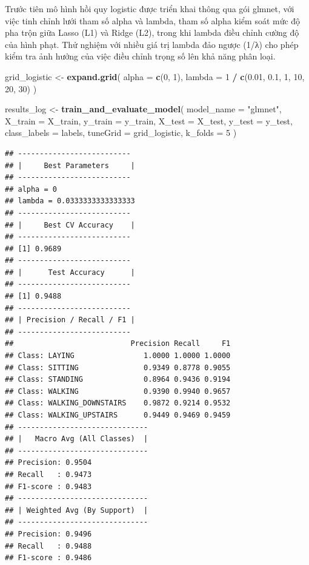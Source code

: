 \documentclass[
]{article}
\newenvironment{Shaded}{\begin{snugshade}}{\end{snugshade}}
\newcommand{\AttributeTok}[1]{\textcolor[rgb]{0.13,0.29,0.53}{#1}}
\newcommand{\DecValTok}[1]{\textcolor[rgb]{0.00,0.00,0.81}{#1}}
\newcommand{\FloatTok}[1]{\textcolor[rgb]{0.00,0.00,0.81}{#1}}
\newcommand{\FunctionTok}[1]{\textcolor[rgb]{0.13,0.29,0.53}{\textbf{#1}}}
\newcommand{\NormalTok}[1]{#1}
\newcommand{\OtherTok}[1]{\textcolor[rgb]{0.56,0.35,0.01}{#1}}
\newcommand{\SpecialCharTok}[1]{\textcolor[rgb]{0.81,0.36,0.00}{\textbf{#1}}}
\newcommand{\StringTok}[1]{\textcolor[rgb]{0.31,0.60,0.02}{#1}}
\begin{document}
Trước tiên mô hình hồi quy logistic được triển khai thông qua gói
glmnet, với việc tinh chỉnh lưới tham số alpha và lambda, tham số alpha
kiểm soát mức độ pha trộn giữa Lasso (L1) và Ridge (L2), trong khi
lambda điều chỉnh cường độ của hình phạt. Thử nghiệm với nhiều giá trị
lambda đảo ngược (1/λ) cho phép kiểm tra ảnh hưởng của việc điều chỉnh
trọng số lên khả năng phân loại.

\begin{Shaded}
\begin{Highlighting}[]
\NormalTok{grid\_logistic }\OtherTok{\textless{}{-}} \FunctionTok{expand.grid}\NormalTok{(}
  \AttributeTok{alpha =} \FunctionTok{c}\NormalTok{(}\DecValTok{0}\NormalTok{, }\DecValTok{1}\NormalTok{),}
  \AttributeTok{lambda =} \DecValTok{1} \SpecialCharTok{/} \FunctionTok{c}\NormalTok{(}\FloatTok{0.01}\NormalTok{, }\FloatTok{0.1}\NormalTok{, }\DecValTok{1}\NormalTok{, }\DecValTok{10}\NormalTok{, }\DecValTok{20}\NormalTok{, }\DecValTok{30}\NormalTok{)}
\NormalTok{)}

\NormalTok{results\_log }\OtherTok{\textless{}{-}} \FunctionTok{train\_and\_evaluate\_model}\NormalTok{(}
  \AttributeTok{model\_name =} \StringTok{"glmnet"}\NormalTok{,}
  \AttributeTok{X\_train =}\NormalTok{ X\_train,}
  \AttributeTok{y\_train =}\NormalTok{ y\_train,}
  \AttributeTok{X\_test =}\NormalTok{ X\_test, }
  \AttributeTok{y\_test =}\NormalTok{ y\_test,}
  \AttributeTok{class\_labels =}\NormalTok{ labels,}
  \AttributeTok{tuneGrid =}\NormalTok{ grid\_logistic,}
  \AttributeTok{k\_folds =} \DecValTok{5}
\NormalTok{)}
\end{Highlighting}
\end{Shaded}

\begin{verbatim}
## --------------------------
## |     Best Parameters     |
## --------------------------
## alpha = 0
## lambda = 0.0333333333333333
## --------------------------
## |     Best CV Accuracy    |
## --------------------------
## [1] 0.9689
## --------------------------
## |      Test Accuracy      |
## --------------------------
## [1] 0.9488
## --------------------------
## | Precision / Recall / F1 |
## --------------------------
##                           Precision Recall     F1
## Class: LAYING                1.0000 1.0000 1.0000
## Class: SITTING               0.9349 0.8778 0.9055
## Class: STANDING              0.8964 0.9436 0.9194
## Class: WALKING               0.9390 0.9940 0.9657
## Class: WALKING_DOWNSTAIRS    0.9872 0.9214 0.9532
## Class: WALKING_UPSTAIRS      0.9449 0.9469 0.9459
## ------------------------------
## |   Macro Avg (All Classes)  |
## ------------------------------
## Precision: 0.9504
## Recall   : 0.9473
## F1-score : 0.9483
## ------------------------------
## | Weighted Avg (By Support)  |
## ------------------------------
## Precision: 0.9496
## Recall   : 0.9488
## F1-score : 0.9486
\end{verbatim}
\end{document}
